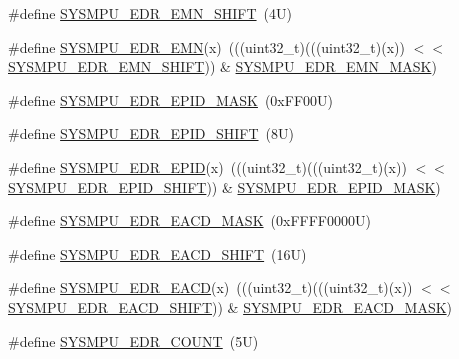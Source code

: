 \begin{DoxyCompactItemize}
\#define \mbox{\hyperlink{group___s_y_s_m_p_u___register___masks_gaebd14b20417f360b1cc7098eecaa1339}{S\+Y\+S\+M\+P\+U\+\_\+\+E\+D\+R\+\_\+\+E\+M\+N\+\_\+\+S\+H\+I\+FT}}~(4\+U)
\item 
\#define \mbox{\hyperlink{group___s_y_s_m_p_u___register___masks_gaa8cc8f96a333140954daf162485bdc5a}{S\+Y\+S\+M\+P\+U\+\_\+\+E\+D\+R\+\_\+\+E\+MN}}(x)~(((uint32\+\_\+t)(((uint32\+\_\+t)(x)) $<$$<$ \mbox{\hyperlink{group___s_y_s_m_p_u___register___masks_gaebd14b20417f360b1cc7098eecaa1339}{S\+Y\+S\+M\+P\+U\+\_\+\+E\+D\+R\+\_\+\+E\+M\+N\+\_\+\+S\+H\+I\+FT}})) \& \mbox{\hyperlink{group___s_y_s_m_p_u___register___masks_ga7976b6fa8a2e6072faf02766c930d637}{S\+Y\+S\+M\+P\+U\+\_\+\+E\+D\+R\+\_\+\+E\+M\+N\+\_\+\+M\+A\+SK}})
\item 
\#define \mbox{\hyperlink{group___s_y_s_m_p_u___register___masks_gae79cdbd254ae868e33b891fa96ff190e}{S\+Y\+S\+M\+P\+U\+\_\+\+E\+D\+R\+\_\+\+E\+P\+I\+D\+\_\+\+M\+A\+SK}}~(0x\+F\+F00\+U)
\item 
\#define \mbox{\hyperlink{group___s_y_s_m_p_u___register___masks_gaa12359a8177a0e0be420dfe61a46aac3}{S\+Y\+S\+M\+P\+U\+\_\+\+E\+D\+R\+\_\+\+E\+P\+I\+D\+\_\+\+S\+H\+I\+FT}}~(8\+U)
\item 
\#define \mbox{\hyperlink{group___s_y_s_m_p_u___register___masks_ga022f0cc87ea2c18e23efddb55affefc1}{S\+Y\+S\+M\+P\+U\+\_\+\+E\+D\+R\+\_\+\+E\+P\+ID}}(x)~(((uint32\+\_\+t)(((uint32\+\_\+t)(x)) $<$$<$ \mbox{\hyperlink{group___s_y_s_m_p_u___register___masks_gaa12359a8177a0e0be420dfe61a46aac3}{S\+Y\+S\+M\+P\+U\+\_\+\+E\+D\+R\+\_\+\+E\+P\+I\+D\+\_\+\+S\+H\+I\+FT}})) \& \mbox{\hyperlink{group___s_y_s_m_p_u___register___masks_gae79cdbd254ae868e33b891fa96ff190e}{S\+Y\+S\+M\+P\+U\+\_\+\+E\+D\+R\+\_\+\+E\+P\+I\+D\+\_\+\+M\+A\+SK}})
\item 
\#define \mbox{\hyperlink{group___s_y_s_m_p_u___register___masks_gaf99289e521fdaa84ea9e2c3527bceb1c}{S\+Y\+S\+M\+P\+U\+\_\+\+E\+D\+R\+\_\+\+E\+A\+C\+D\+\_\+\+M\+A\+SK}}~(0x\+F\+F\+F\+F0000\+U)
\item 
\#define \mbox{\hyperlink{group___s_y_s_m_p_u___register___masks_ga8947db0bb6e311a2118dfadb5bb65cb9}{S\+Y\+S\+M\+P\+U\+\_\+\+E\+D\+R\+\_\+\+E\+A\+C\+D\+\_\+\+S\+H\+I\+FT}}~(16\+U)
\item 
\#define \mbox{\hyperlink{group___s_y_s_m_p_u___register___masks_gad72d9bc3c29f2531ff8b2b8de21f4e50}{S\+Y\+S\+M\+P\+U\+\_\+\+E\+D\+R\+\_\+\+E\+A\+CD}}(x)~(((uint32\+\_\+t)(((uint32\+\_\+t)(x)) $<$$<$ \mbox{\hyperlink{group___s_y_s_m_p_u___register___masks_ga8947db0bb6e311a2118dfadb5bb65cb9}{S\+Y\+S\+M\+P\+U\+\_\+\+E\+D\+R\+\_\+\+E\+A\+C\+D\+\_\+\+S\+H\+I\+FT}})) \& \mbox{\hyperlink{group___s_y_s_m_p_u___register___masks_gaf99289e521fdaa84ea9e2c3527bceb1c}{S\+Y\+S\+M\+P\+U\+\_\+\+E\+D\+R\+\_\+\+E\+A\+C\+D\+\_\+\+M\+A\+SK}})
\item 
\#define \mbox{\hyperlink{group___s_y_s_m_p_u___register___masks_ga24478da038839c1350817f983549ede6}{S\+Y\+S\+M\+P\+U\+\_\+\+E\+D\+R\+\_\+\+C\+O\+U\+NT}}~(5\+U)
\end{DoxyCompactItemize}
